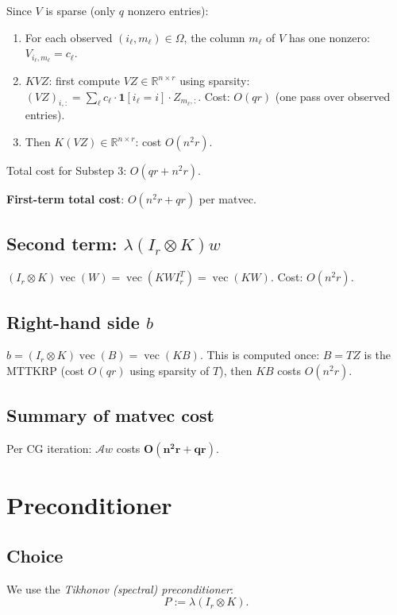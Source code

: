 \documentclass[12pt]{article}
\theoremstyle{definition}
\theoremstyle{remark}
\DeclareMathOperator{\vecop}{vec}
\begin{document}
Since $V$ is sparse (only $q$ nonzero entries):
\begin{enumerate}
\item For each observed $(i_\ell,m_\ell)\in\Omega$, the column $m_\ell$ of
  $V$ has one nonzero: $V_{i_\ell,m_\ell} = c_\ell$.
\item $KVZ$: first compute $VZ\in\mathbb{R}^{n\times r}$ using sparsity:
  $(VZ)_{i,:} = \sum_\ell c_\ell\cdot\mathbf{1}[i_\ell=i]\cdot Z_{m_\ell,:}$.
  Cost: $O(qr)$ (one pass over observed entries).
\item Then $K(VZ)\in\mathbb{R}^{n\times r}$: cost $O(n^2r)$.
\end{enumerate}
Total cost for Substep 3: $O(qr + n^2r)$.

\textbf{First-term total cost}: $O(n^2r + qr)$ per matvec.

\subsection{Second term: $\lambda(I_r\otimes K)w$}

$(I_r\otimes K)\vecop(W) = \vecop(KWI_r^T) = \vecop(KW)$.
Cost: $O(n^2r)$.

\subsection{Right-hand side $b$}

$b = (I_r\otimes K)\vecop(B) = \vecop(KB)$.  This is computed once:
$B = TZ$ is the MTTKRP (cost $O(qr)$ using sparsity of $T$), then $KB$
costs $O(n^2r)$.

\subsection{Summary of matvec cost}

Per CG iteration: $\mathcal{A}w$ costs $\mathbf{O(n^2r + qr)}$.

\section{Preconditioner}

\subsection{Choice}

We use the \emph{Tikhonov (spectral) preconditioner}:
\begin{equation}\label{eq:prec}
  P := \lambda(I_r\otimes K).
\end{equation}
\end{document}
